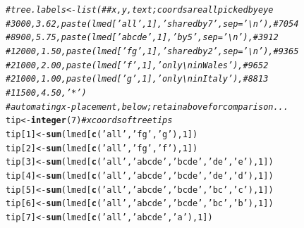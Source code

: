\documentclass{article}\usepackage[]{graphicx}\usepackage[]{color}
\makeatletter
\newcommand{\hlnum}[1]{\textcolor[rgb]{0.686,0.059,0.569}{#1}}%
\newcommand{\hlstr}[1]{\textcolor[rgb]{0.192,0.494,0.8}{#1}}%
\newcommand{\hlcom}[1]{\textcolor[rgb]{0.678,0.584,0.686}{\textit{#1}}}%
\newcommand{\hlstd}[1]{\textcolor[rgb]{0.345,0.345,0.345}{#1}}%
\newcommand{\hlkwb}[1]{\textcolor[rgb]{0.69,0.353,0.396}{#1}}%
\newcommand{\hlkwd}[1]{\textcolor[rgb]{0.737,0.353,0.396}{\textbf{#1}}}%
\newenvironment{kframe}{%
 \def\at@end@of@kframe{}%
 \ifinner\ifhmode%
  \def\at@end@of@kframe{\end{minipage}}%
  \begin{minipage}{\columnwidth}%
 \fi\fi%
 \def\FrameCommand##1{\hskip\@totalleftmargin \hskip-\fboxsep
 \colorbox{shadecolor}{##1}\hskip-\fboxsep
     \hskip-\linewidth \hskip-\@totalleftmargin \hskip\columnwidth}%
 \MakeFramed {\advance\hsize-\width
   \@totalleftmargin\z@ \linewidth\hsize
   \@setminipage}}%
 {\par\unskip\endMakeFramed%
 \at@end@of@kframe}
\newenvironment{knitrout}{}{} %
\makeatother
\begin{document}
\begin{knitrout}
\begin{kframe}
\begin{alltt}
  \hlcom{#tree.labels <- list( ## x,y,text; coords are all picked by eye}
  \hlcom{#   3000, 3.62, paste(lmed['all'  ,1], 'shared by 7', sep='\textbackslash{}n'), # 7054}
  \hlcom{#   8900, 5.75, paste(lmed['abcde',1], 'by 5'       , sep='\textbackslash{}n'), # 3912}
  \hlcom{#  12000, 1.50, paste(lmed['fg'   ,1], 'shared by 2', sep='\textbackslash{}n'), # 9365}
  \hlcom{#  21000, 2.00, paste(lmed['f'    ,1], 'only\textbackslash{}nin Wales'),        # 9652 }
  \hlcom{#  21000, 1.00, paste(lmed['g'    ,1], 'only\textbackslash{}nin Italy'),        # 8813 }
  \hlcom{#  11500, 4.50, '*')}
  \hlcom{# automating x-placement, below; retain above for comparison...}
  \hlstd{tip} \hlkwb{<-} \hlkwd{integer}\hlstd{(}\hlnum{7}\hlstd{)}  \hlcom{# x coords of tree tips}
  \hlstd{tip[}\hlnum{1}\hlstd{]} \hlkwb{<-}\hlkwd{sum}\hlstd{(lmed[}\hlkwd{c}\hlstd{(}\hlstr{'all'}\hlstd{,}\hlstr{'fg'}\hlstd{,}\hlstr{'g'}\hlstd{),}\hlnum{1}\hlstd{])}
  \hlstd{tip[}\hlnum{2}\hlstd{]} \hlkwb{<-}\hlkwd{sum}\hlstd{(lmed[}\hlkwd{c}\hlstd{(}\hlstr{'all'}\hlstd{,}\hlstr{'fg'}\hlstd{,}\hlstr{'f'}\hlstd{),}\hlnum{1}\hlstd{])}
  \hlstd{tip[}\hlnum{3}\hlstd{]} \hlkwb{<-}\hlkwd{sum}\hlstd{(lmed[}\hlkwd{c}\hlstd{(}\hlstr{'all'}\hlstd{,}\hlstr{'abcde'}\hlstd{,}\hlstr{'bcde'}\hlstd{,}\hlstr{'de'}\hlstd{,}\hlstr{'e'}\hlstd{),}\hlnum{1}\hlstd{])}
  \hlstd{tip[}\hlnum{4}\hlstd{]} \hlkwb{<-}\hlkwd{sum}\hlstd{(lmed[}\hlkwd{c}\hlstd{(}\hlstr{'all'}\hlstd{,}\hlstr{'abcde'}\hlstd{,}\hlstr{'bcde'}\hlstd{,}\hlstr{'de'}\hlstd{,}\hlstr{'d'}\hlstd{),}\hlnum{1}\hlstd{])}
  \hlstd{tip[}\hlnum{5}\hlstd{]} \hlkwb{<-}\hlkwd{sum}\hlstd{(lmed[}\hlkwd{c}\hlstd{(}\hlstr{'all'}\hlstd{,}\hlstr{'abcde'}\hlstd{,}\hlstr{'bcde'}\hlstd{,}\hlstr{'bc'}\hlstd{,}\hlstr{'c'}\hlstd{),}\hlnum{1}\hlstd{])}
  \hlstd{tip[}\hlnum{6}\hlstd{]} \hlkwb{<-}\hlkwd{sum}\hlstd{(lmed[}\hlkwd{c}\hlstd{(}\hlstr{'all'}\hlstd{,}\hlstr{'abcde'}\hlstd{,}\hlstr{'bcde'}\hlstd{,}\hlstr{'bc'}\hlstd{,}\hlstr{'b'}\hlstd{),}\hlnum{1}\hlstd{])}
  \hlstd{tip[}\hlnum{7}\hlstd{]} \hlkwb{<-}\hlkwd{sum}\hlstd{(lmed[}\hlkwd{c}\hlstd{(}\hlstr{'all'}\hlstd{,}\hlstr{'abcde'}\hlstd{,}\hlstr{'a'}\hlstd{),}\hlnum{1}\hlstd{])}


\end{alltt}
\end{kframe}
\end{knitrout}
\end{document}
